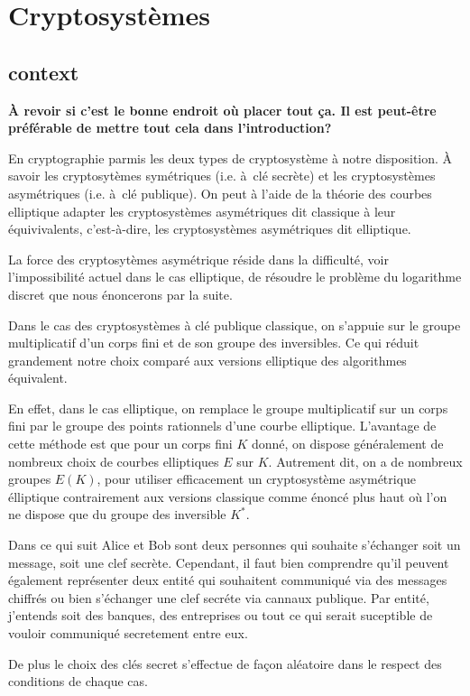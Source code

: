 \chapter{Cryptosystèmes}
\section{context}
\textbf{À revoir si c'est le bonne endroit où placer tout ça. Il est peut-être préférable de
mettre tout cela dans l'introduction?}

En cryptographie parmis les deux types de cryptosystème à notre disposition. À savoir les cryptosytèmes symétriques (i.e. à clé secrète) et les cryptosystèmes asymétriques (i.e. à clé publique). On peut à l'aide de la théorie des courbes elliptique adapter les cryptosystèmes asymétriques dit classique à leur équivivalents, c'est-à-dire, les cryptosystèmes asymétriques dit elliptique.

La force des cryptosytèmes asymétrique réside dans la difficulté, voir l'impossibilité actuel dans le cas elliptique, de résoudre le problème du logarithme discret que nous énoncerons par la suite.

Dans le cas des cryptosystèmes à clé publique classique, on s'appuie sur le groupe multiplicatif d'un corps fini et de son groupe des inversibles. Ce qui réduit grandement notre choix comparé aux versions elliptique des algorithmes équivalent.

En effet, dans le cas elliptique, on remplace le groupe multiplicatif sur un corps fini par le groupe des points rationnels d'une courbe elliptique. L'avantage de cette méthode est que pour un corps fini  $K$ donné, on dispose généralement de nombreux choix de courbes elliptiques $E$ sur $K$. Autrement dit, on a de nombreux groupes $E(K)$, pour utiliser efficacement un cryptosystème asymétrique élliptique contrairement aux versions classique comme énoncé plus haut où
l'on ne dispose que du groupe des inversible $K^{*}$.


Dans ce qui suit Alice et Bob sont deux personnes qui souhaite s'échanger soit un message, soit une clef secrète. Cependant, il faut bien comprendre qu'il peuvent également représenter deux entité qui souhaitent communiqué via des messages chiffrés ou bien s'échanger une clef secréte via cannaux publique. Par entité, j'entends soit des banques, des entreprises ou tout ce qui serait suceptible de vouloir communiqué secretement entre eux.

De plus le choix des clés secret s'effectue de façon aléatoire dans le respect des conditions de chaque cas.

